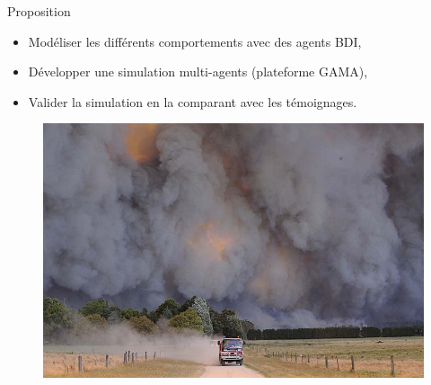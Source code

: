 \documentclass{beamer}
\begin{document}
    \begin{frame}{Proposition}
        \begin{itemize}
            \item Modéliser les différents comportements avec des agents BDI,
            \item Développer une simulation multi-agents (plateforme GAMA),
            \item Valider la simulation en la comparant avec les témoignages.
        \end{itemize}
        \begin{figure}[h]
            \includegraphics[scale=0.3]{PJ-1.jpg}
        \end{figure}
    \end{frame}

    \footnotesize
    
    
\end{document}
